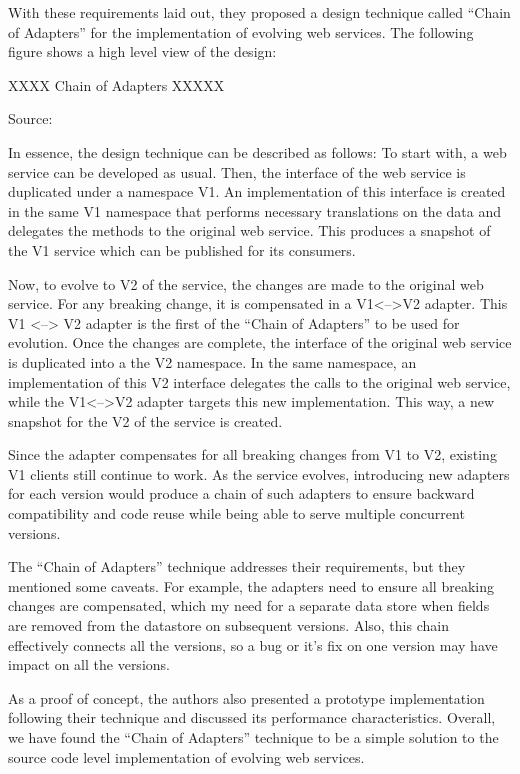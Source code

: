 \documentclass[runningheads,a4paper]{llncs}
\begin{document}
With these requirements laid out, they proposed a design technique called ``Chain of Adapters'' for the implementation of evolving web services. The following figure shows a high level view of the design:

XXXX Chain of Adapters XXXXX

Source: \cite{kaminski2006design}

In essence, the design technique can be described as follows: To start with, a web service can be developed as usual. Then, the interface of the web service is duplicated under a namespace V1. An implementation of this interface is created in the same V1 namespace that performs necessary translations on the data and delegates the methods to the original web service. This produces a snapshot of the V1 service which can be published for its consumers.

Now, to evolve to V2 of the service, the changes are made to the original web service. For any breaking change, it is compensated in a V1<-->V2 adapter. This V1 <--> V2 adapter is the first of the ``Chain of Adapters'' to be used for evolution. Once the changes are complete, the interface of the original web service is duplicated into a the V2 namespace. In the same namespace, an implementation of this V2 interface delegates the calls to the original web service, while the V1<-->V2 adapter targets this new implementation. This way, a new snapshot for the V2 of the service is created.

Since the adapter compensates for all breaking changes from V1 to V2, existing V1 clients still continue to work. As the service evolves, introducing new adapters for each version would produce a chain of such adapters to ensure backward compatibility and code reuse while being able to serve multiple concurrent versions.

The ``Chain of Adapters'' technique addresses their requirements, but they mentioned some caveats. For example, the adapters need to ensure all breaking changes are compensated, which my need for a separate data store when fields are removed from the datastore on subsequent versions. Also, this chain effectively connects all the versions, so a bug or it’s fix on one version may have impact on all the versions.

As a proof of concept, the authors also presented a prototype implementation following their technique and discussed its performance characteristics. Overall, we have found the ``Chain of Adapters'' technique to be a simple solution to the source code level implementation of evolving web services.
\end{document}
